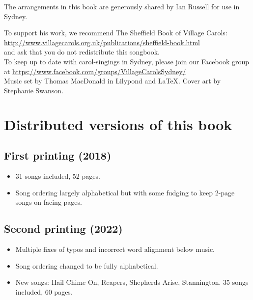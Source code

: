 \documentclass[a4paper,twoside]{article}
\date{\vspace{-12ex}}
\newcommand*{\offset}{5mm}
\begin{document}
%

\clearpage

\thispagestyle{empty}
    \null{}
        \begin{center}        
The arrangements in this book are generously shared by Ian Russell for use in Sydney. 

To support his work, we recommend The Sheffield Book of Village Carols: \url{http://www.villagecarols.org.uk/publications/sheffield-book.html}\\
and ask that you do not redistribute this songbook.\\


To keep up to date with carol-singings in Sydney, please join our Facebook group at \url{https://www.facebook.com/groups/VillageCarolsSydney/}\\

Music set by Thomas MacDonald in Lilypond and LaTeX. Cover art by Stephanie Swanson.
       \end{center}
\null

\section*{Distributed versions of this book}
\subsection*{First printing (2018)}
\begin{itemize}
    \item 31 songs included, 52 pages.
    \item Song ordering largely alphabetical but with some fudging to keep 2-page songs on facing pages.
\end{itemize}
\subsection*{Second printing (2022)}
\begin{itemize}
    \item Multiple fixes of typos and incorrect word alignment below music.
    \item Song ordering changed to be fully alphabetical. 
    \item New songs: Hail Chime On, Reapers, Shepherds Arise, Stannington. 35 songs included, 60 pages.
\end{itemize} 
\clearpage
\end{document}
